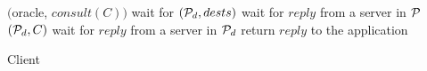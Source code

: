 \begin{algorithm}[t!]
\small

\begin{distribalgo}[1]

\vspace{1.0mm}


\vspace{1.0mm}

        \STATE \amcast$($oracle, $consult(C))$
        \STATE wait for $(\mathcal{P}_d,dests)$
                        \STATE wait for $reply$ from a server in $\mathcal{P}$
                \ENDFOR
            \ENDIF
            \STATE \amcast$(\mathcal{P}_d, C)$
            \STATE wait for $reply$ from a server in $\mathcal{P}_d$
    \ENDINDENT
    \STATE return $reply$ to the application
\ENDINDENT

\caption{Client}
\label{alg:client_proxy}
\end{distribalgo}
\end{algorithm}